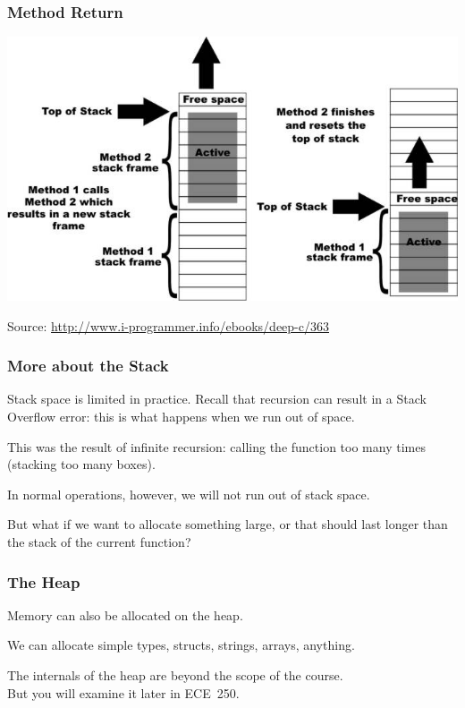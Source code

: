 \begin{frame}
\frametitle{Method Return}

\begin{center}
	\includegraphics[width=\textwidth]{images/stackframes.jpg}
\end{center}
Source: \url{http://www.i-programmer.info/ebooks/deep-c/363}
\end{frame}


\begin{frame}
\frametitle{More about the Stack}

Stack space is limited in practice. Recall that recursion can result in a Stack Overflow error: this is what happens when we run out of space.

This was the result of infinite recursion: calling the function too many times (stacking too many boxes).

In normal operations, however, we will not run out of stack space.

But what if we want to allocate something large, or that should last longer than the stack of the current function?

\end{frame}

\begin{frame}
\frametitle{The Heap}

Memory can also be allocated on the heap.

We can allocate simple types, structs, strings, arrays, anything.

The internals of the heap are beyond the scope of the course.\\
\quad But you will examine it later in ECE~250.

\end{frame}

